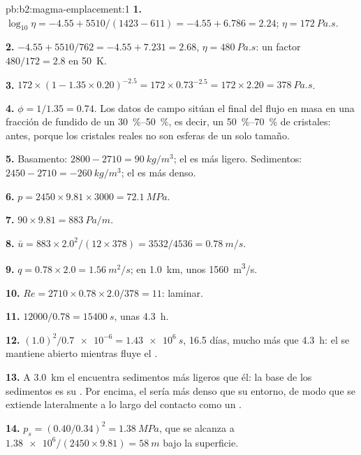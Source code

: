 \begin{solution}{pb:b2:magma-emplacement:1}
\textbf{1.} $\log_{10}\eta = -4.55 + 5510/(1423 - 611) = -4.55 + 6.786 = 2.24$;
$\eta = \qty{172}{Pa.s}$.

\textbf{2.} $-4.55 + 5510/762 = -4.55 + 7.231 = 2.68$, $\eta = \qty{480}{Pa.s}$: un
factor $480/172 = 2.8$ en \qty{50}{K}.

\textbf{3.} $172\times(1 - 1.35\times0.20)^{-2.5} = 172\times0.73^{-2.5} = 172\times2.20 =
\qty{378}{Pa.s}$.

\textbf{4.} $\phi = 1/1.35 = 0.74$. Los datos de campo sitúan el final del flujo en masa
en una fracción de fundido de un \qtyrange{30}{50}{\percent}, es decir, un
\qtyrange{50}{70}{\percent} de cristales: antes, porque los cristales reales no son
esferas de un solo tamaño.

\textbf{5.} Basamento: $2800 - 2710 = \qty{90}{kg/m^3}$; el  es más ligero.
Sedimentos: $2450 - 2710 = \qty{-260}{kg/m^3}$; el  es más denso.

\textbf{6.} $p = 2450\times9.81\times3000 = \qty{72.1}{MPa}$.

\textbf{7.} $90\times9.81 = \qty{883}{Pa/m}$.

\textbf{8.} $\bar u = 883\times2.0^2/(12\times378) = 3532/4536 = \qty{0.78}{m/s}$.

\textbf{9.} $q = 0.78\times2.0 = \qty{1.56}{m^2/s}$; en \qty{1.0}{km}, unos
\qty{1560}{m^3/s}.

\textbf{10.} $Re = 2710\times0.78\times2.0/378 = 11$: laminar.

\textbf{11.} $12000/0.78 = \qty{15400}{s}$, unas \qty{4.3}{h}.

\textbf{12.} $(1.0)^2/\num{0.7e-6} = \qty{1.43e6}{s}$, 16.5 días, mucho más que
\qty{4.3}{h}: el  se mantiene abierto mientras fluye el .

\textbf{13.} A \qty{3.0}{km} el  encuentra sedimentos más ligeros que él: la
base de los sedimentos es su . Por encima, el  sería
más denso que su entorno, de modo que se extiende lateralmente a lo largo del contacto como un
.

\textbf{14.} $p_s = (0.40/0.34)^2 = \qty{1.38}{MPa}$, que se alcanza a
$\num{1.38e6}/(2450\times9.81) = \qty{58}{m}$ bajo la superficie.


\end{solution}
